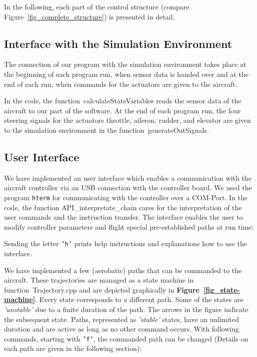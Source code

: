 \documentclass[11pt,a4paper]{scrartcl}		%
\begin{document}
In the following, each part of the control structure (compare Figure~\ref{fig_complete_structure}) is presented in detail.

\medskip





\subsection{Interface with the Simulation Environment}

The connection of our program with the simulation environment takes place at the beginning of each program run, when sensor data is handed over and at the end of each run, when commands for the actuators are given to the aircraft.

In the code, the function~\textsf{calculateStateVariables} reads the sensor data of the aircraft to our part of the software.
At the end of each program run, the four steering signals for the actuators throttle, aileron, rudder, and elevator are given to the simulation environment in the function~\textsf{generateOutSignals}.

\medskip




\subsection{User Interface}

We have implemented an user interface which enables a communication with the aircraft controller via an USB connection with the controller board. 
We used the program \texttt{hterm} for communicating with the controller over a COM-Port.
In the code, the function \textsf{API\_interpretate\_chain} cares for the interpretation of the user commands and the instruction transfer.
The interface enables the user to modify controller parameters and flight special pre-established paths at run time:

\medskip

Sending the letter \texttt{'h'} prints help instructions and explanations how to use the interface.

\medskip

We have implemented a few (aerobatic) paths that can be commanded to the aircraft. 
These trajectories are managed as a state machine in function~\textsf{Trajectory.cpp} and are depicted graphically in \textbf{Figure~\ref{fig_state-machine}}. 
Every state corresponds to a different path. Some of the states are \textsl{'unstable'} due to a finite duration of the path. The arrows in the figure indicate the subsequent state. 
Paths, represented as \textsl{'stable'} states, have an unlimited duration and are active as long as no other command occurs.
With following commands, starting with \texttt{'f'}, the commanded path can be changed (Details on each path are given in the following section):
\end{document}
